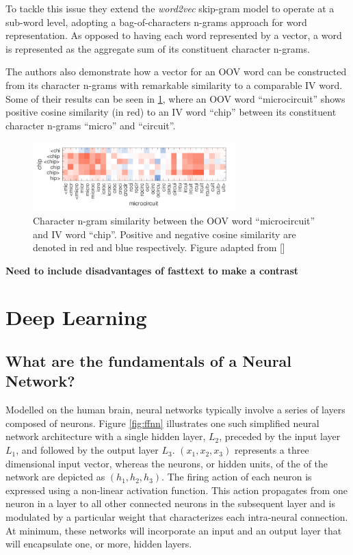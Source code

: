 \documentclass[12pt, a4paper]{report}
\theoremstyle{definition}
\theoremstyle{definition}%
\theoremstyle{definition}%
\theoremstyle{definition}%
\theoremstyle{definition}%
\theoremstyle{definition}%
\renewcommand{\cite}[1]{[\citealp{#1}]}
\begin{document}
To tackle this issue they extend the \textit{word2vec} skip-gram model to operate at a sub-word level, adopting a bag-of-characters n-grams approach for word representation. As opposed to having each word represented by a vector, a word is represented as the aggregate sum of its constituent character n-grams.

The authors also demonstrate how a vector for an OOV word can be constructed from its character n-grams with remarkable similarity to a comparable IV word. Some of their results can be seen in \ref{fig:fasttext_oov_similarity}, where an OOV word \enquote{microcircuit} shows positive cosine similarity (in red) to an IV word \enquote{chip} between its constituent character n-grams \enquote{micro} and \enquote{circuit}.

\begin{figure}[!ht]
	\centering
	\includegraphics[width=0.7\textwidth]{./figures/fasttext_oov_similarity.png}
	\caption{Character n-gram similarity between the OOV word \enquote{microcircuit} and IV word \enquote{chip}. Positive and negative cosine similarity are denoted in red and blue respectively. Figure adapted from \cite{bojanowski2017}}
	\label{fig:fasttext_oov_similarity}
\end{figure}

\textbf{Need to include disadvantages of fasttext to make a contrast}

\section{Deep Learning}
\subsection{What are the fundamentals of a Neural Network?}
Modelled on the human brain, neural networks typically involve a series of layers composed of neurons. Figure \ref{fig:ffnn} illustrates one such simplified neural network architecture with a single hidden layer, $L_2$, preceded by the input layer $L_1$, and followed by the output layer $L_3$. $(x_1, x_2, x_3)$ represents a three dimensional input vector, whereas the neurons, or hidden units, of the of the network are depicted as $(h_1, h_2, h_3)$. The firing action of each neuron is expressed using a non-linear activation function. This action propagates from one neuron in a layer to all other connected neurons in the subsequent layer and is modulated by a particular weight that characterizes each intra-neural connection. At minimum, these networks will incorporate an input and an output layer that will encapsulate one, or more, hidden layers.
\end{document}
